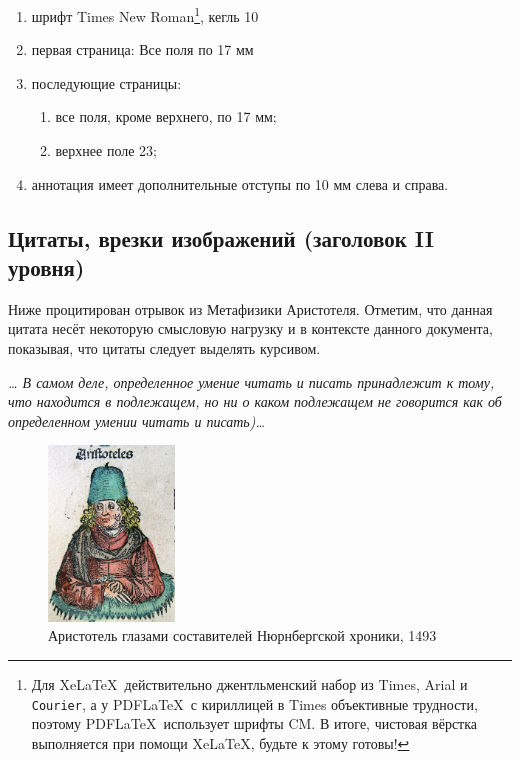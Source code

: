 \documentclass{spisok-article}
\begin{document}
\begin{enumerate}
\item
  шрифт Times New Roman\footnote{Для Xe\LaTeX ~действительно
  джентльменский набор из Times, \textsf{Arial} и \texttt{Courier},
  а у PDF\LaTeX ~с кириллицей в Times объективные трудности, поэтому
  PDF\LaTeX ~использует шрифты CM.  В итоге, чистовая вёрстка
  выполняется при помощи Xe\LaTeX, будьте к этому готовы!}, кегль 10
\item
  первая страница: Все поля по 17 мм
\item
  последующие страницы:

  \begin{enumerate}
  \item
    все поля, кроме верхнего, по 17 мм;
  \item
    верхнее поле 23;
  \end{enumerate}
\item
  аннотация имеет дополнительные отступы по 10 мм слева и справа.
\end{enumerate}

\subsection{Цитаты, врезки изображений (заголовок II уровня)}

Ниже процитирован отрывок из Метафизики Аристотеля. Отметим, что
данная цитата несёт некоторую смысловую нагрузку и в контексте данного
документа, показывая, что цитаты следует выделять курсивом.

\emph{\ldots{} В самом деле, определенное умение читать и писать
  принадлежит к тому, что находится в подлежащем, но ни о каком
  подлежащем не говорится как об определенном умении читать и
  писать)\ldots}

\begin{figure}[h]
\begin{center}
\includegraphics[width=0.3\textwidth]{Aristotle.jpg}
\end{center}
\caption{Аристотель глазами составителей Нюрнбергской хроники,
  1493}\label{fig:aristotle}
\end{figure}
\end{document}
